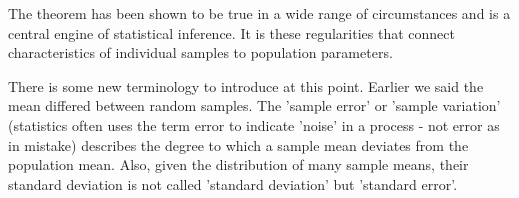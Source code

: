 \documentclass{article}
\begin{document}
The theorem has been shown to be true in a wide range of circumstances and is a central engine of statistical inference. It is these regularities that connect characteristics of individual samples to population parameters.

There is some new terminology to introduce at this point. Earlier we said the mean differed between random samples. The 'sample error' or 'sample variation' (statistics often uses the term error to indicate 'noise' in a process - not error as in mistake) describes the degree to which a sample mean deviates from the population mean. Also, given the distribution of many sample means, their standard deviation is not called 'standard deviation' but 'standard error'. 
\end{document}
